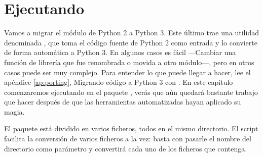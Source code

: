 \section{Ejecutando }

Vamos a migrar el módulo  de Python 2 a Python 3. Este último trae una utilidad denominada , que toma el código fuente de Python 2 como entrada y lo convierte de forma automática a Python 3. En algunos casos es fácil ---Cambiar una función de librería que fue renombrada o movida a otro módulo---, pero en otros casos puede ser muy complejo. Para entender lo que puede llegar a hacer, lee el apéndice \ref{ap:porting}, Migrando código a Python 3 con . En este capítulo comenzaremos ejecutando  en el paquete , verás que aún quedará bastante trabajo que hacer después de que las herramientas automatizadas hayan aplicado su magia.

El paquete  está dividido en varios ficheros, todos en el mismo directorio. El script  facilita la conversión de varios ficheros a la vez: basta con pasarle el nombre del directorio como parámetro y  convertirá cada uno de los ficheros que contenga.


